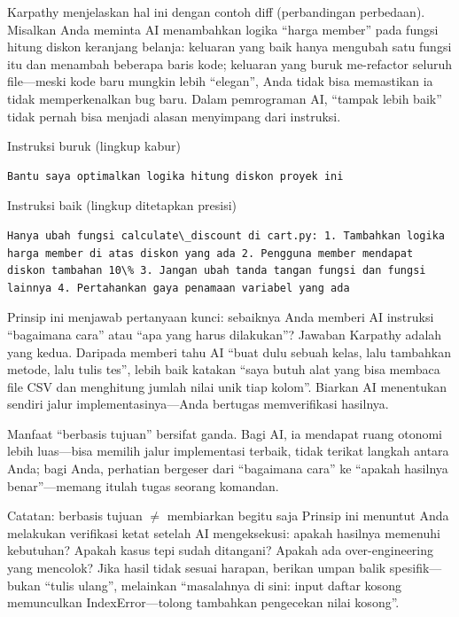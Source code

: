 Karpathy menjelaskan hal ini dengan contoh diff (perbandingan perbedaan). Misalkan Anda meminta AI menambahkan logika “harga member” pada fungsi hitung diskon keranjang belanja: keluaran yang baik hanya mengubah satu fungsi itu dan menambah beberapa baris kode; keluaran yang buruk me-refactor seluruh file—meski kode baru mungkin lebih “elegan”, Anda tidak bisa memastikan ia tidak memperkenalkan bug baru. Dalam pemrograman AI, “tampak lebih baik” tidak pernah bisa menjadi alasan menyimpang dari instruksi.

Instruksi buruk (lingkup kabur)

\begin{lstlisting}
Bantu saya optimalkan logika hitung diskon proyek ini
\end{lstlisting}

Instruksi baik (lingkup ditetapkan presisi)

\begin{lstlisting}
Hanya ubah fungsi calculate\_discount di cart.py: 1. Tambahkan logika harga member di atas diskon yang ada 2. Pengguna member mendapat diskon tambahan 10\% 3. Jangan ubah tanda tangan fungsi dan fungsi lainnya 4. Pertahankan gaya penamaan variabel yang ada
\end{lstlisting}


Prinsip ini menjawab pertanyaan kunci: sebaiknya Anda memberi AI instruksi “bagaimana cara” atau “apa yang harus dilakukan”? Jawaban Karpathy adalah yang kedua. Daripada memberi tahu AI “buat dulu sebuah kelas, lalu tambahkan metode, lalu tulis tes”, lebih baik katakan “saya butuh alat yang bisa membaca file CSV dan menghitung jumlah nilai unik tiap kolom”. Biarkan AI menentukan sendiri jalur implementasinya—Anda bertugas memverifikasi hasilnya.

Manfaat “berbasis tujuan” bersifat ganda. Bagi AI, ia mendapat ruang otonomi lebih luas—bisa memilih jalur implementasi terbaik, tidak terikat langkah antara Anda; bagi Anda, perhatian bergeser dari “bagaimana cara” ke “apakah hasilnya benar”—memang itulah tugas seorang komandan.

\begin{tcbwarn}{Catatan: berbasis tujuan $\neq$ membiarkan begitu saja}
Prinsip ini menuntut Anda melakukan verifikasi ketat setelah AI mengeksekusi: apakah hasilnya memenuhi kebutuhan? Apakah kasus tepi sudah ditangani? Apakah ada over-engineering yang mencolok? Jika hasil tidak sesuai harapan, berikan umpan balik spesifik—bukan “tulis ulang”, melainkan “masalahnya di sini: input daftar kosong memunculkan IndexError—tolong tambahkan pengecekan nilai kosong”.

\end{tcbwarn}

